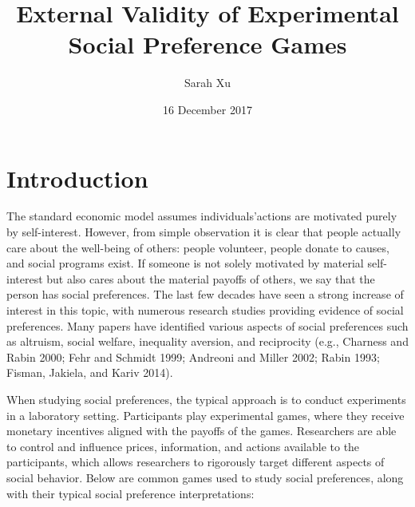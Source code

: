 \documentclass[12pt]{article}
\title{External Validity of Experimental Social Preference Games}
\author{Sarah Xu}
\date{16 December 2017}
\begin{document}
\maketitle

\section{Introduction}

The standard economic model assumes individuals\rq actions are motivated purely by self-interest. However, from simple observation it is clear that people actually care about the well-being of others: people volunteer, people donate to causes, and social programs exist. If someone is not solely motivated by material self-interest but also cares about the material payoffs of others, we say that the person has social preferences. The last few decades have seen a strong increase of interest in this topic, with numerous research studies providing evidence of social preferences. Many papers have identified various aspects of social preferences such as altruism, social welfare, inequality aversion, and reciprocity (e.g., Charness and Rabin 2000; Fehr and Schmidt 1999; Andreoni and Miller 2002; Rabin 1993; Fisman, Jakiela, and Kariv 2014). 
 
When studying social preferences, the typical approach is to conduct experiments in a laboratory setting. Participants play experimental games, where they receive monetary incentives aligned with the payoffs of the games. Researchers are able to control and influence prices, information, and actions available to the participants, which allows researchers to rigorously target different aspects of social behavior. Below are common games used to study social preferences, along with their typical social preference interpretations: 
\end{document}

